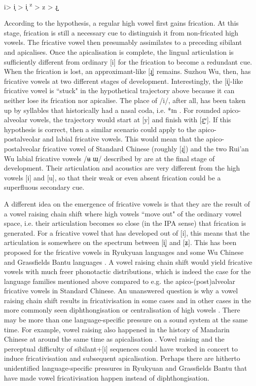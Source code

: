 \documentclass[output=paper,colorlinks,citecolor=brown,chinesefont]{langscibook}
\begin{document}
\ea \label{histo_dev}
    \begin{tabbing}
 \qquad i\quad > \quad i̝ \quad> \quad i̝ \textsuperscript{z} \quad> \quad z \quad> \quad ɹ̺
    \end{tabbing}
\z

According to the hypothesis, a regular high vowel first gains frication. At this stage, frication is still a necessary cue to distinguish it from non-fricated high vowels. The fricative vowel then presumably assimilates to a preceding sibilant and apicalises. Once the apicalisation is complete, the lingual articulation is sufficiently different from ordinary [i] for the frication to become a redundant cue. When the frication is lost, an approximant-like [ɹ̺] remains. Suzhou Wu, then, has fricative vowels at two different stages of development. Interestingly, the [i̝]-like fricative vowel is ``stuck" in the hypothetical trajectory above because it can neither lose its frication nor apicalise. The place of /i/, after all, has been taken up by syllables that historically had a nasal coda, i.e. *ɪn \citep[3]{Hu&Ling_2019}. For rounded apico-alveolar vowels, the trajectory would start at [y] and finish with [ɹ̺ʷ]. If this hypothesis is correct, then a similar scenario could apply to the apico-postalveolar and labial fricative vowels. This would mean that the apico-postalveolar fricative vowel of Standard Chinese (roughly [ɻ]) and the two Rui'an Wu labial fricative vowels /ʉ ɯ/ described by \citet{Hu&He_2019} are at the final stage of development. Their articulation and acoustics are very different from the high vowels [i] and [u], so that their weak or even absent frication could be a superfluous secondary cue.

A different idea on the emergence of fricative vowels is that they are the result of a vowel raising chain shift where high vowels ``move out" of the ordinary vowel space, i.e. their articulation becomes so close (in the IPA sense) that frication is generated. For a fricative vowel that has developed out of [i], this means that the articulation is somewhere on the spectrum between [i̝] and [ʑ]. This has been proposed for the fricative vowels in Ryukyuan languages \citep{Jarosz_2018} and some Wu Chinese and Grassfields Bantu languages \citep{Faytak_2014b}. A vowel raising chain shift would yield fricative vowels with much freer phonotactic distributions, which is indeed the case for the language families mentioned above compared to e.g. the apico-(post)alveolar fricative vowels in Standard Chinese. An unanswered question is why a vowel raising chain shift results in fricativisation in some cases and in other cases in the more commonly seen diphthongisation or centralisation of high vowels \citep{Faytak_2014b}. There may be more than one language-specific pressure on a sound system at the same time. For example, vowel raising also happened in the history of Mandarin Chinese at around the same time as apicalisation \citep[258--261]{shen_phonological_2020}. Vowel raising and the perceptual difficulty of sibilant+[i] sequences could have worked in concert to induce fricativisation and subsequent apicalisation. Perhaps there are hitherto unidentified language-specific pressures in Ryukyuan and Grassfields Bantu that have made vowel fricativisation happen instead of diphthongisation.
\end{document}
